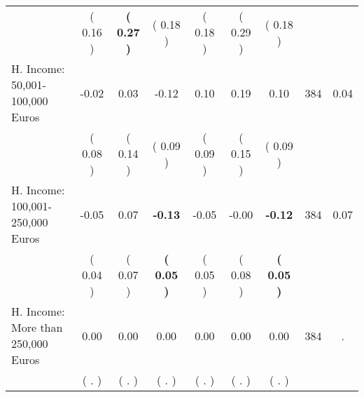 \begin{tabular}{lcccccccc}
 & (     0.16 ) & \textbf{(     0.27 )} & (     0.18 ) & (     0.18 ) & (     0.29 ) & (     0.18 ) & \\
H. Income: 50,001-100,000 Euros &     -0.02 &      0.03 &     -0.12 &      0.10 &      0.19 &      0.10 & 384 &       0.04 \\ 
 & (     0.08 ) & (     0.14 ) & (     0.09 ) & (     0.09 ) & (     0.15 ) & (     0.09 ) & \\
H. Income: 100,001-250,000 Euros &     -0.05 &      0.07 & \textbf{    -0.13} &     -0.05 &     -0.00 & \textbf{    -0.12} & 384 &       0.07 \\ 
 & (     0.04 ) & (     0.07 ) & \textbf{(     0.05 )} & (     0.05 ) & (     0.08 ) & \textbf{(     0.05 )} & \\
H. Income: More than 250,000 Euros &      0.00 &      0.00 &      0.00 &      0.00 &      0.00 &      0.00 & 384 &          . \\ 
 & (        . ) & (        . ) & (        . ) & (        . ) & (        . ) & (        . ) & \\
\bottomrule
\end{tabular}
